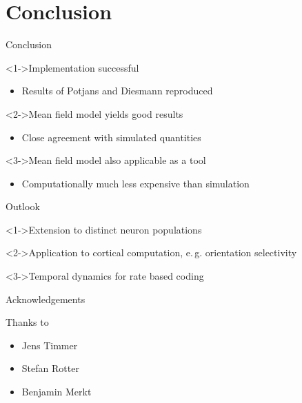 \documentclass[xcolor=x11names,compress]{beamer}
\renewcommand{\(}{\begin{columns}}
\renewcommand{\)}{\end{columns}}
\newcommand{\<}[1]{\begin{column}{#1}}
\renewcommand{\>}{\end{column}}
\begin{document}
\section{Conclusion}
\label{sec:conclusion}

\begin{frame}[t]{Conclusion}
    \begin{block}<1->{Implementation successful}
        \begin{itemize}
            \item 
        Results of Potjans and Diesmann reproduced
        \end{itemize}
    \end{block}
    \vfill
    \begin{block}<2->{Mean field model yields good results}
        \begin{itemize}
            \item 
        Close agreement with simulated quantities
        \end{itemize}
    \end{block}
    \vfill
    \begin{block}<3->{Mean field model also applicable as a tool}
        \begin{itemize}
            \item 
        Computationally much less expensive than simulation
        \end{itemize}
    \end{block}
\end{frame}

\begin{frame}[t]{Outlook}
    \begin{block}<1->{Extension to distinct neuron populations}
    \end{block}
    \vfill
    \begin{block}<2->{Application to cortical computation, e.\,g. orientation selectivity}
    \end{block}
    \vfill
    \begin{block}<3->{Temporal dynamics for rate based coding}
    \end{block}
\end{frame}


\begin{frame}[t]{Acknowledgements}
    \begin{block}{Thanks to}
        \begin{itemize}
            \item Jens Timmer 
            \item Stefan Rotter
            \item Benjamin Merkt 
        \end{itemize}
    \end{block}
\end{frame}
\end{document}
